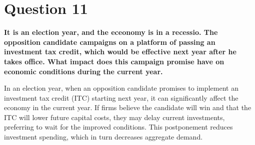 \begin{center}
\end{center}

\section*{Question 11}
\textbf{It is an election year, and the eceonomy is in a recessio. The opposition candidate 
campaigns on a platform of passing an investment tax credit, which would be effective next year
after he takes office. What impact does this campaign promise have on economic conditions during the current year.} 

In an election year, when an opposition candidate promises to implement an investment tax credit (ITC) starting next year, it can significantly affect the economy in the current year. If firms believe the candidate will win and that the ITC will lower future capital costs, they may delay current investments, preferring to wait for the improved conditions. This postponement reduces investment spending, which in turn decreases aggregate demand.

